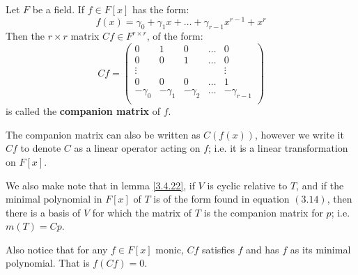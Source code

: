 \begin{definition}
    Let $F$ be a field. If  $f \in F[x]$ has the form:
        \begin{equation}
            f(x)=\gamma_0+\gamma_1x+\dots+\gamma_{r-1}x^{r-1}+x^r
        \end{equation}
    Then the $r \times r$ matrix  $Cf \in F^{r \times r}$, of the form:
        \begin{equation}
            Cf=\begin{pmatrix}
                0   &   1   &   0   &   \dots   &   0   \\
                0   &   0   &   1   &   \dots   &   0   \\
                \vdots  &   &   &   &   \vdots  \\
                0   &   0   &   0   &   \dots   &   1   \\
                -\gamma_0   & -\gamma_1 &   -\gamma_2   &   \dots   & -\gamma_{r-1}   \\
            \end{pmatrix}
        \end{equation}
    is called the \textbf{companion matrix} of $f$.
\end{definition}
\begin{remark}
    The companion matrix can also be written as $C(f(x))$, however we write it
    $Cf$ to denote  $C$ as a linear operator acting on  $f$; i.e. it is a
    linear transformation on  $F[x]$.
\end{remark}
\begin{remark}
    We also make note that in lemma \ref{3.4.22}, if $V$ is cyclic relative to
     $T$, and if the minimal polynomial in $F[x]$ of $T$ is of the form found
     in equation  $(3.14)$, then there is a basis of $V$ for which the matrix
     of  $T$ is the companion matrix for  $p$; i.e.  $m(T)=Cp$.

     Also notice that for any $f \in F[x]$ monic, $Cf$ satisfies  $f$ and has
     $f$ as its minimal polynomial. That is  $f(Cf)=0$.
\end{remark}

